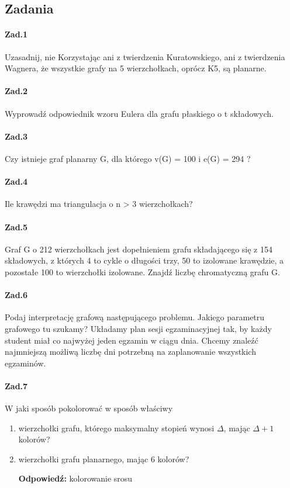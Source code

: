 \documentclass[a4paper,12pt]{article}
\theoremstyle{definition}%
\theoremstyle{definition}
\theoremstyle{problem}
\begin{document}
\subsection{Zadania}
\paragraph{Zad.1} Uzasadnij, nie Korzystając ani z twierdzenia Kuratowskiego, ani z twierdzenia Wagnera, że wszystkie grafy na 5 wierzchołkach, oprócz K5, są planarne.

\paragraph{Zad.2} Wyprowadź odpowiednik wzoru Eulera dla grafu płaskiego o t składowych.

\paragraph{Zad.3} Czy istnieje graf planarny G, dla którego v(G) = 100 i e(G) = 294 ?

\paragraph{Zad.4} Ile krawędzi ma triangulacja o n > 3 wierzchołkach?

\paragraph{Zad.5} Graf G o 212 wierzchołkach jest dopełnieniem grafu składającego się z 154 składowych, z których 4 to cykle o długości trzy, 50 to izolowane krawędzie, a pozostałe 100 to wierzchołki izolowane. Znajdź liczbę chromatyczną grafu G.

\paragraph{Zad.6} Podaj interpretację grafową następującego problemu. Jakiego parametru grafowego tu szukamy?
Układamy plan sesji egzaminacyjnej tak, by każdy student miał co najwyżej jeden egzamin w ciągu dnia. Chcemy znaleźć najmniejszą możliwą liczbę dni potrzebną na zaplanowanie wszystkich egzaminów.

\paragraph{Zad.7} W jaki sposób pokolorować w sposób właściwy
\begin{enumerate}[label=\alph*)]
\item wierzchołki grafu, którego maksymalny stopień wynosi $\Delta $, mając $\Delta +1$ kolorów?
\item wierzchołki grafu planarnego, mając 6 kolorów?

\textbf{Odpowiedź: }kolorowanie srosu
\end{enumerate}
\end{document}
